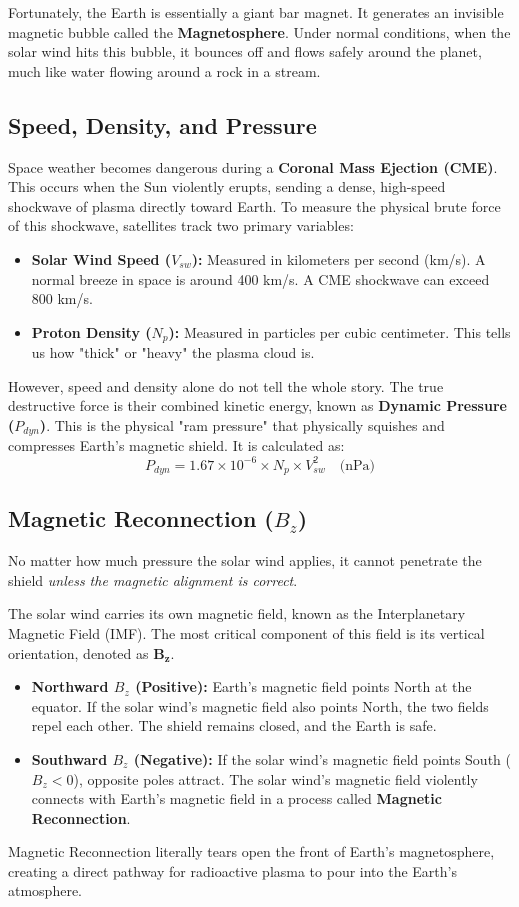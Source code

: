 \documentclass[12pt]{article}
\begin{document}
Fortunately, the Earth is essentially a giant bar magnet. It generates an invisible magnetic bubble called the \textbf{Magnetosphere}. Under normal conditions, when the solar wind hits this bubble, it bounces off and flows safely around the planet, much like water flowing around a rock in a stream. 

\subsection{Speed, Density, and Pressure}
Space weather becomes dangerous during a \textbf{Coronal Mass Ejection (CME)}. This occurs when the Sun violently erupts, sending a dense, high-speed shockwave of plasma directly toward Earth. To measure the physical brute force of this shockwave, satellites track two primary variables:
\begin{itemize}
    \item \textbf{Solar Wind Speed ($V_{sw}$):} Measured in kilometers per second (km/s). A normal breeze in space is around 400 km/s. A CME shockwave can exceed 800 km/s.
    \item \textbf{Proton Density ($N_p$):} Measured in particles per cubic centimeter. This tells us how "thick" or "heavy" the plasma cloud is.
\end{itemize}

However, speed and density alone do not tell the whole story. The true destructive force is their combined kinetic energy, known as \textbf{Dynamic Pressure ($P_{dyn}$)}. This is the physical "ram pressure" that physically squishes and compresses Earth's magnetic shield. It is calculated as:
\begin{equation}
P_{dyn} = 1.67 \times 10^{-6} \times N_p \times V_{sw}^2 \quad \text{(nPa)}
\end{equation}

\subsection{Magnetic Reconnection ($B_z$)}
No matter how much pressure the solar wind applies, it cannot penetrate the shield \textit{unless the magnetic alignment is correct}. 

The solar wind carries its own magnetic field, known as the Interplanetary Magnetic Field (IMF). The most critical component of this field is its vertical orientation, denoted as $\mathbf{B_z}$.
\begin{itemize}
    \item \textbf{Northward $B_z$ (Positive):} Earth's magnetic field points North at the equator. If the solar wind's magnetic field also points North, the two fields repel each other. The shield remains closed, and the Earth is safe.
    \item \textbf{Southward $B_z$ (Negative):} If the solar wind's magnetic field points South ($B_z < 0$), opposite poles attract. The solar wind's magnetic field violently connects with Earth's magnetic field in a process called \textbf{Magnetic Reconnection}\cite{ref1}. 
\end{itemize}
Magnetic Reconnection literally tears open the front of Earth's magnetosphere, creating a direct pathway for radioactive plasma to pour into the Earth's atmosphere.
\end{document}
